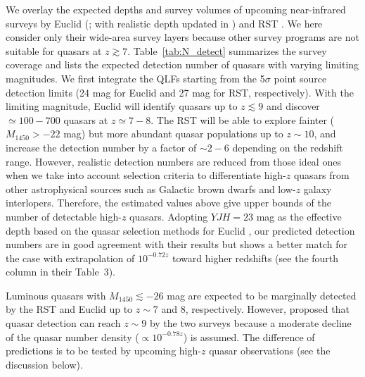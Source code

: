 \documentclass[twocolumn, twocolappendix]{aastex63}
\newcommand{\Muv}{M_{1450}}
\begin{document}
\begin{CJK*}{UTF8}{gbsn}
We overlay the expected depths and survey volumes of upcoming near-infrared surveys by
Euclid (\citealt{2011arXiv1110.3193L}; with realistic depth updated in \citealt{2019Barnett}) and RST \citep{2019arXiv190205569A}.
We here consider only their wide-area survey layers because other survey programs are not suitable for quasars at $z\gtrsim 7$.
Table~\ref{tab:N_detect} summarizes the survey coverage and lists the expected detection number of quasars with varying limiting magnitudes.
We first integrate the QLFs starting from the 5$\sigma$ point source detection limits (24 mag for Euclid and 27 mag for RST, respectively).
With the limiting magnitude, Euclid will identify quasars up to $z\lesssim 9$ and discover $\simeq 100-700$ quasars at $z\simeq 7-8$.
The RST will be able to explore fainter ($\Muv>-22$ mag) but more abundant quasar populations up to $z\sim 10$,
and increase the detection number by a factor of $\sim 2-6$ depending on the redshift range.
However, realistic detection numbers are reduced from those ideal ones when we take into account selection criteria to differentiate 
high-$z$ quasars from other astrophysical sources such as Galactic brown dwarfs and low-$z$ galaxy interlopers.
Therefore, the estimated values above give upper bounds of the number of detectable high-$z$ quasars.
Adopting $YJH=23$ mag as the effective depth based on the quasar selection methods for Euclid \citep{2019Barnett},
our predicted detection numbers are in good agreement with their results but shows a better match for the case with extrapolation of $10^{-0.72z}$
toward higher redshifts (see the fourth column in their Table~3).



Luminous quasars with $\Muv \lesssim -26$ mag are expected to be marginally detected by the RST and Euclid up to $z\sim 7$ and 8, respectively.
However, \citet{2019BAAS...51c.121F} proposed that quasar detection can reach $z\sim 9$ by the two surveys
because a moderate decline of the quasar number density ($\propto 10^{-0.78z}$) is assumed.
The difference of predictions is to be tested by upcoming high-$z$ quasar observations (see the discussion below).




\end{CJK*}
\end{document}
